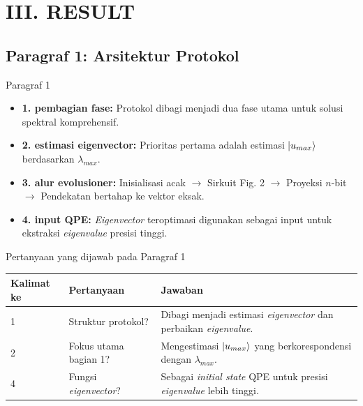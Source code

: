 \section{III. RESULT}

\subsection{Paragraf 1: Arsitektur Protokol}
\begin{frame}{Paragraf 1}
    \begin{itemize}
        \item \textbf{1. pembagian fase:} Protokol dibagi menjadi dua fase utama untuk solusi spektral komprehensif.
        \item \textbf{2. estimasi eigenvector:} Prioritas pertama adalah estimasi $\ket{u_{max}}$ berdasarkan $\lambda_{max}$.
        \item \textbf{3. alur evolusioner:} Inisialisasi acak $\to$ Sirkuit Fig. 2 $\to$ Proyeksi $n$-bit $\to$ Pendekatan bertahap ke vektor eksak.
        \item \textbf{4. input QPE:} \textit{Eigenvector} teroptimasi digunakan sebagai input untuk ekstraksi \textit{eigenvalue} presisi tinggi.
    \end{itemize}
\end{frame}

\begin{frame}{Pertanyaan yang dijawab pada Paragraf 1}
    \centering
    \small
    \begin{tabular}{lp{4.5cm}p{6cm}}
        \toprule
        Kalimat ke & Pertanyaan & Jawaban \\
        \midrule
        1 & Struktur protokol? & Dibagi menjadi estimasi \textit{eigenvector} dan perbaikan \textit{eigenvalue}. \\
        2 & Fokus utama bagian 1? & Mengestimasi $\ket{u_{max}}$ yang berkorespondensi dengan $\lambda_{max}$. \\
        4 & Fungsi \textit{eigenvector}? & Sebagai \textit{initial state} QPE untuk presisi \textit{eigenvalue} lebih tinggi. \\
        \bottomrule
    \end{tabular}
\end{frame}

